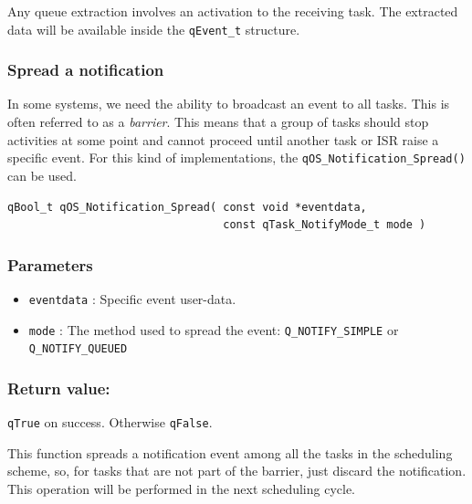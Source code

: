 \documentclass{article}
\begin{document}


\begin{tcolorbox}
\HandRight Any queue extraction involves an activation to the receiving task. The extracted data will be available inside the \lstinline{qEvent_t} structure.
\end{tcolorbox}

\subsubsection{Spread a notification}
In some systems, we need the ability to broadcast an event to all tasks. This is often referred to as a \textit{barrier}. This means that a group of tasks should stop activities at some point and cannot proceed until another task or ISR raise a specific event. 
For this kind of implementations, the \lstinline{qOS_Notification_Spread()}  can be used. \\

\begin{lstlisting}[style=CStyle]
qBool_t qOS_Notification_Spread( const void *eventdata, 
                                 const qTask_NotifyMode_t mode )
\end{lstlisting}

\subsubsection*{Parameters}
\begin{itemize}
    \item \lstinline{eventdata} : Specific event user-data. 
    \item \lstinline{mode} : The method used to spread the event: \lstinline{Q_NOTIFY_SIMPLE} or \lstinline{Q_NOTIFY_QUEUED}
\end{itemize}

\subsubsection*{Return value:}

\lstinline{qTrue} on success. Otherwise \lstinline{qFalse}.

\noindent\hrulefill
\newline

\begin{tcolorbox}
\HandRight This function spreads a notification event among all the tasks in the scheduling scheme, so,  for tasks that are not part of the barrier, just discard the notification. This operation will be performed in the next scheduling cycle.
\end{tcolorbox}
\end{document}

